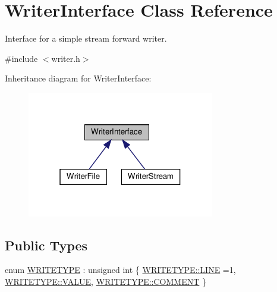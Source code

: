 \hypertarget{classWriterInterface}{}\section{Writer\+Interface Class Reference}
\label{classWriterInterface}


Interface for a simple stream forward writer.  




{\ttfamily \#include $<$writer.\+h$>$}



Inheritance diagram for Writer\+Interface\+:
\nopagebreak
\begin{figure}[H]
\begin{center}
\leavevmode
\includegraphics[width=232pt]{classWriterInterface__inherit__graph}
\end{center}
\end{figure}
\subsection*{Public Types}
\begin{DoxyCompactItemize}
\item 
enum \hyperlink{classWriterInterface_af35706b761b016972144a9333637d93d}{W\+R\+I\+T\+E\+T\+Y\+PE} \+: unsigned int \{ \hyperlink{classWriterInterface_af35706b761b016972144a9333637d93da17b8ef2c330f1430e00c9de5469fc7e7}{W\+R\+I\+T\+E\+T\+Y\+P\+E\+::\+L\+I\+NE} =1, 
\hyperlink{classWriterInterface_af35706b761b016972144a9333637d93daecc2e9c313faddb07e7da223c1dc5c3f}{W\+R\+I\+T\+E\+T\+Y\+P\+E\+::\+V\+A\+L\+UE}, 
\hyperlink{classWriterInterface_af35706b761b016972144a9333637d93daf2cd320b55767434dd48d81b165ea956}{W\+R\+I\+T\+E\+T\+Y\+P\+E\+::\+C\+O\+M\+M\+E\+NT}
 \}
\end{DoxyCompactItemize}
